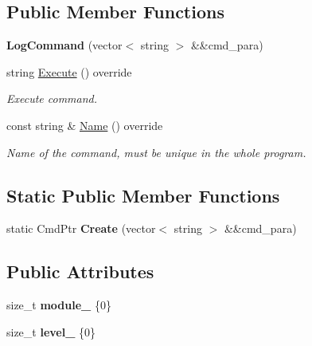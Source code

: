 \subsection*{Public Member Functions}
\begin{DoxyCompactItemize}
\item 
\mbox{\label{classLogCommand_a2b6f7d4d317d63985e503a42f500424d}} 
{\bfseries Log\+Command} (vector$<$ string $>$ \&\&cmd\+\_\+para)
\item 
\mbox{\label{classLogCommand_aa7727d96ced7972072d105753189496b}} 
string \hyperlink{classLogCommand_aa7727d96ced7972072d105753189496b}{Execute} () override
\begin{DoxyCompactList}\small\item\em Execute command. \end{DoxyCompactList}\item 
const string \& \hyperlink{classLogCommand_aba05f5a8920ce0526d22ecfd93ea5060}{Name} () override
\begin{DoxyCompactList}\small\item\em Name of the command, must be unique in the whole program. \end{DoxyCompactList}\end{DoxyCompactItemize}
\subsection*{Static Public Member Functions}
\begin{DoxyCompactItemize}
\item 
\mbox{\label{classLogCommand_a3138e2c479ca4784e830495f7ac7ddb5}} 
static Cmd\+Ptr {\bfseries Create} (vector$<$ string $>$ \&\&cmd\+\_\+para)
\end{DoxyCompactItemize}
\subsection*{Public Attributes}
\begin{DoxyCompactItemize}
\item 
\mbox{\label{classLogCommand_ae685ab0c3bf8b85a8a7b1ad570a1df7d}} 
size\+\_\+t {\bfseries module\+\_\+} \{0\}
\item 
\mbox{\label{classLogCommand_aac97a104558320e9eb3e33d3ceee6663}} 
size\+\_\+t {\bfseries level\+\_\+} \{0\}
\end{DoxyCompactItemize}
